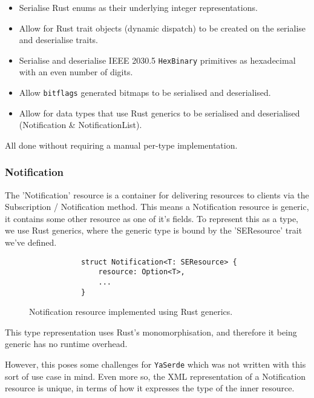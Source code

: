 \begin{itemize}
    \item Serialise Rust enums as their underlying integer representations.
    \item Allow for Rust trait objects (dynamic dispatch) to be created on the serialise and deserialise traits.
    \item Serialise and deserialise IEEE 2030.5 \texttt{HexBinary} primitives as hexadecimal with an even number of digits. 
    \item Allow \texttt{bitflags} generated bitmaps to be serialised and deserialised.
    \item Allow for data types that use Rust generics to be serialised and deserialised (Notification \& NotificationList).
\end{itemize}

All done without requiring a manual per-type implementation.

\subsubsection{Notification}
The 'Notification' resource is a container for delivering resources to clients via the Subscription / Notification method. This means a Notification resource is generic, it contains some other resource as one of it's fields. To represent this as a type, we use Rust generics, where the generic type is bound by the 'SEResource' trait we've defined.

\begin{figure}[H]
    \begin{center}
        \begin{lstlisting}
            struct Notification<T: SEResource> {
                resource: Option<T>,
                ...
            }
        \end{lstlisting}
        \label{fig:notifgeneric}
        \caption{Notification resource implemented using Rust generics.}
    \end{center}
\end{figure}

This type representation uses Rust's monomorphisation, and therefore it being generic has no runtime overhead.

However, this poses some challenges for \texttt{YaSerde} which was not written with this sort of use case in mind. Even more so, the XML representation of a Notification resource is unique, in terms of how it expresses the type of the inner resource.

